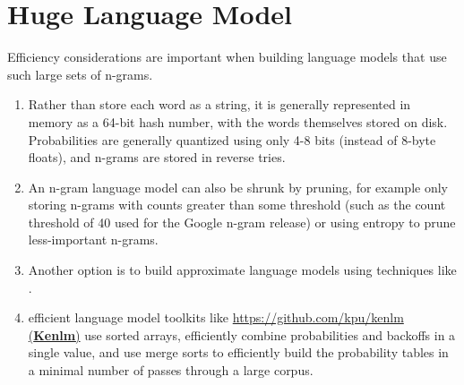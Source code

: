 \section{Huge Language Model}
Efficiency considerations are important when building language models that use such large sets of n-grams. 
\begin{enumerate}
    \item Rather than store each word as a string, it is generally represented in memory as a 64-bit hash number, with the words themselves stored on disk. Probabilities are generally quantized using only 4-8 bits (instead of 8-byte floats), and n-grams are stored in reverse tries.
    \item An n-gram language model can also be shrunk by pruning, for example only storing n-grams with counts greater than some threshold (such as the count threshold of 40 used for the Google n-gram release) or using entropy to prune less-important n-grams.
    \item Another option is to build approximate language models using techniques like .
    \item efficient language model toolkits like \href{https://github.com/kpu/kenlm}{https://github.com/kpu/kenlm (\textbf{Kenlm})} use sorted arrays, efficiently combine probabilities and backoffs in a single value, and use merge sorts to efficiently build the probability tables in a minimal number of passes through a large corpus.
\end{enumerate}












































